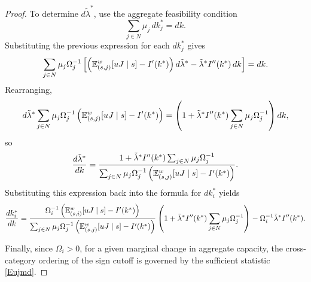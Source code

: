 \documentclass[master.tex]{subfiles}
\begin{document}
\begin{proof}
To determine \(d\tilde\lambda^\ast\), use the aggregate feasibility condition
\[
\sum_{j\in N}\mu_j\,dk_j^\ast = dk.
\]
Substituting the previous expression for each \(dk_j^\ast\) gives
\[
\sum_{j\in N}\mu_j\Omega_j^{-1}
\left[
\left(
\mathbb{E}_{(s,j)}^w[uJ\mid s] 
-I'(k^\ast)
\right)d\tilde\lambda^\ast
-
\tilde\lambda^\ast I''(k^\ast)\,dk
\right]
=
dk.
\]
Rearranging,
\[
d\tilde\lambda^\ast
\sum_{j\in N}\mu_j\Omega_j^{-1}\left(\mathbb{E}_{(s,j)}^w[uJ\mid s] -I'(k^\ast)\right)
=
\left(
1+\tilde\lambda^\ast I''(k^\ast)\sum_{j\in N}\mu_j\Omega_j^{-1}
\right)dk,
\]
so
\[
\frac{d\tilde\lambda^\ast}{dk}
=
\frac{
1+\tilde\lambda^\ast I''(k^\ast)\sum_{j\in N}\mu_j\Omega_j^{-1}
}{
\sum_{j\in N}\mu_j\Omega_j^{-1}\left(\mathbb{E}_{(s,j)}^w[uJ\mid s] -I'(k^\ast)\right)
}.
\]
Substituting this expression back into the formula for \(dk_i^\ast\) yields
\[
\frac{dk_i^\ast}{dk}
=
\frac{
\Omega_i^{-1}
\left(
\mathbb{E}_{(s,i)}^w[uJ\mid s]
-I'(k^\ast)
\right)
}{
\sum_{j\in N}\mu_j\Omega_j^{-1}\left(\mathbb{E}_{(s,j)}^w[uJ\mid s] -I'(k^\ast)\right)
}
\left(
1+\tilde\lambda^\ast I''(k^\ast)\sum_{j\in N}\mu_j\Omega_j^{-1}
\right)
-\Omega_i^{-1}\tilde\lambda^\ast I''(k^\ast).
\]

Finally, since \(\Omega_i>0\), for a given marginal change in aggregate capacity, the cross-category ordering of the sign cutoff is governed by the sufficient statistic \eqref{Eujmd}. 
\end{proof}
\end{document}
